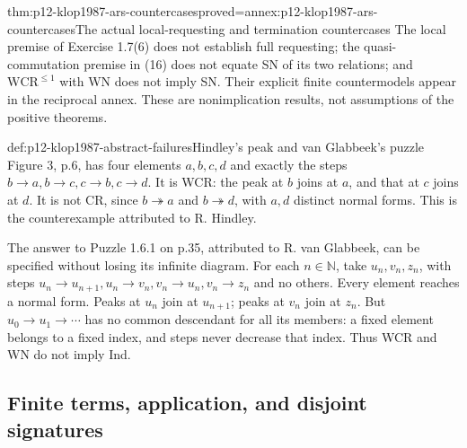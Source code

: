 \begin{hbtheorem}{thm:p12-klop1987-ars-countercases}{proved=annex:p12-klop1987-ars-countercases}{The actual local-requesting and termination countercases}
The local premise of Exercise 1.7(6) does not establish full requesting;
the quasi-commutation premise in (16) does not equate SN of its two
relations; and \(\mathrm{WCR}^{\leq1}\) with WN does not imply
SN. Their explicit finite countermodels appear in the reciprocal annex.
These are nonimplication results, not assumptions of the positive theorems.
\end{hbtheorem}

\begin{hbexample}{def:p12-klop1987-abstract-failures}{Hindley's peak and van Glabbeek's puzzle}
Figure 3, p.6, has four elements \(a,b,c,d\) and exactly the steps
\(b\to a,b\to c,c\to b,c\to d\). It is WCR: the peak at
\(b\) joins at \(a\), and that at \(c\) joins at \(d\).
It is not CR, since \(b\twoheadrightarrow a\) and
\(b\twoheadrightarrow d\), with \(a,d\) distinct normal forms.
This is the counterexample attributed to R. Hindley.

The answer to Puzzle 1.6.1 on p.35, attributed to R. van Glabbeek,
can be specified without losing its infinite diagram. For each
\(n\in\mathbb N\), take \(u_n,v_n,z_n\), with steps
\(u_n\to u_{n+1},u_n\to v_n,v_n\to u_n,v_n\to z_n\)
and no others. Every element reaches a normal form. Peaks at \(u_n\)
join at \(u_{n+1}\); peaks at \(v_n\) join at \(z_n\).
But \(u_0\to u_1\to\cdots\) has no common descendant for all its
members: a fixed element belongs to a fixed index, and steps never decrease
that index. Thus WCR and WN do not imply Ind.
\end{hbexample}

\subsection{Finite terms, application, and disjoint signatures}

